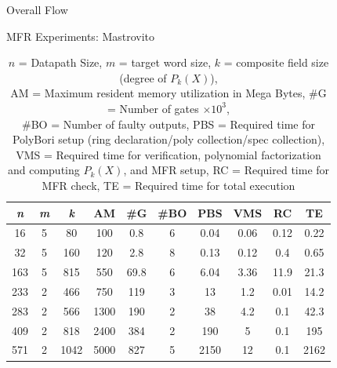\begin{frame} {\large Overall Flow}


\end{frame}

\begin{frame}{\large MFR Experiments: Mastrovito}


{\scriptsize
\begin{table}[bht]
\centering
\caption*{{\scriptsize $\textit{n}$ = Datapath Size, $\textit{m}$ = target word size, 
$\textit{k}$ = composite field size (degree of $P_k(X)$),\\ 
AM = Maximum resident memory utilization in Mega Bytes,
\#G = Number of gates $\times 10^3$,\\ \#BO = Number of faulty outputs, 
PBS = Required time for PolyBori setup (ring declaration/poly collection/spec collection),
VMS = Required time for verification, polynomial factorization and computing $P_k(X)$, and MFR setup, 
RC = Required time for MFR check, TE = Required time for total execution}}
\label{masvsspec}
\begin{tabular}{| c | c | c | c | c | c | c | c | c | c |} \hline
{\textit{\textbf{n}}} & {\textit{\textbf{m}}} & {\textit{\textbf{k}}} & {\textbf{AM}} & {\textbf{\#G}} 
& {\textbf{\#BO}} & {\textbf{PBS}} & {\textbf{VMS}} & {\textbf{RC}} & {\textbf{TE}} \\ \hline 
16  & 5 & 80   & 100 & 0.8  & 6  & 0.04 & 0.06  & 0.12  & 0.22 \\ \hline
32  & 5 & 160  & 120 & 2.8  & 8  & 0.13 & 0.12  & 0.4   & 0.65 \\ \hline
163 & 5 & 815  & 550 & 69.8 & 6  & 6.04 & 3.36  & 11.9  & 21.3 \\ \hline
233 & 2 & 466  & 750 & 119  & 3  & 13   & 1.2   & 0.01  & 14.2 \\ \hline
283 & 2 & 566  & 1300& 190  & 2  & 38   & 4.2   & 0.1   & 42.3 \\ \hline
409 & 2 & 818  & 2400& 384  & 2  & 190  & 5     & 0.1   & 195  \\ \hline
\rowcolor{green}571 & 2 & 1042 & 5000& 827  & 5  & 2150 & 12    & 0.1   & 2162 \\ \hline
\end{tabular}
\end{table}}

\end{frame}

